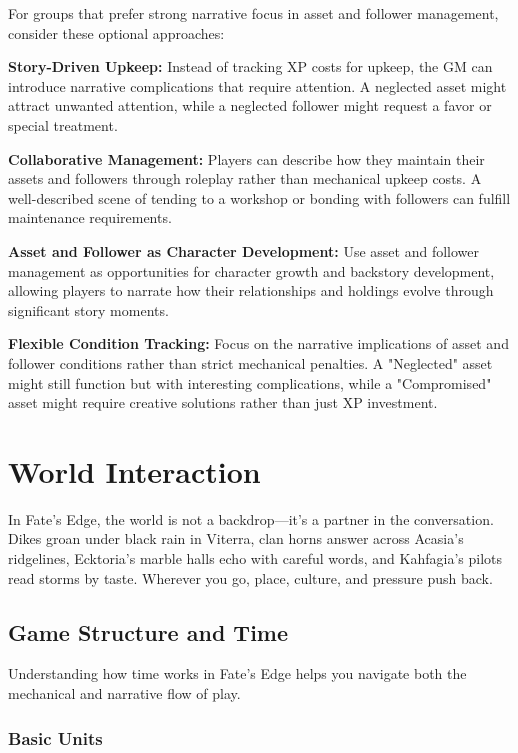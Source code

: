 \documentclass[11pt,twoside,openany]{book}
\begin{document}
For groups that prefer strong narrative focus in asset and follower management, consider these optional approaches:

\textbf{Story-Driven Upkeep:} Instead of tracking XP costs for upkeep, the GM can introduce narrative complications that require attention. A neglected asset might attract unwanted attention, while a neglected follower might request a favor or special treatment.

\textbf{Collaborative Management:} Players can describe how they maintain their assets and followers through roleplay rather than mechanical upkeep costs. A well-described scene of tending to a workshop or bonding with followers can fulfill maintenance requirements.

\textbf{Asset and Follower as Character Development:} Use asset and follower management as opportunities for character growth and backstory development, allowing players to narrate how their relationships and holdings evolve through significant story moments.

\textbf{Flexible Condition Tracking:} Focus on the narrative implications of asset and follower conditions rather than strict mechanical penalties. A "Neglected" asset might still function but with interesting complications, while a "Compromised" asset might require creative solutions rather than just XP investment.

\chapter{World Interaction} \label{ch:world}

In Fate's Edge, the world is not a backdrop—it's a partner in the conversation. Dikes groan under black rain in Viterra, clan horns answer across Acasia's ridgelines, Ecktoria's marble halls echo with careful words, and Kahfagia's pilots read storms by taste. Wherever you go, place, culture, and pressure push back.

\section*{Game Structure and Time} 

Understanding how time works in Fate's Edge helps you navigate both the mechanical and narrative flow of play.

\subsection*{Basic Units}
\end{document}
